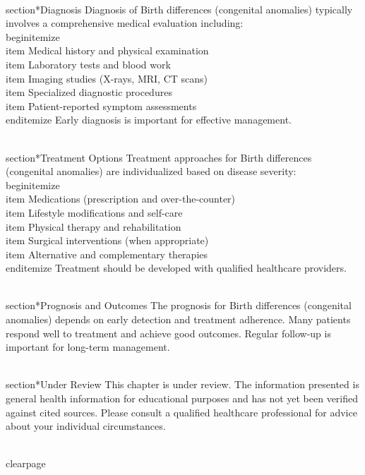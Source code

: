 \\section*{Diagnosis}
Diagnosis of Birth differences (congenital anomalies) typically involves a comprehensive medical evaluation including:
\\begin{itemize}
  \\item Medical history and physical examination
  \\item Laboratory tests and blood work
  \\item Imaging studies (X-rays, MRI, CT scans)
  \\item Specialized diagnostic procedures
  \\item Patient-reported symptom assessments
\\end{itemize}
Early diagnosis is important for effective management.

\\section*{Treatment Options}
Treatment approaches for Birth differences (congenital anomalies) are individualized based on disease severity:
\\begin{itemize}
  \\item Medications (prescription and over-the-counter)
  \\item Lifestyle modifications and self-care
  \\item Physical therapy and rehabilitation
  \\item Surgical interventions (when appropriate)
  \\item Alternative and complementary therapies
\\end{itemize}
Treatment should be developed with qualified healthcare providers.

\\section*{Prognosis and Outcomes}
The prognosis for Birth differences (congenital anomalies) depends on early detection and treatment adherence. Many patients respond well to treatment and achieve good outcomes. Regular follow-up is important for long-term management.

\\section*{Under Review}
This chapter is under review. The information presented is general health information for educational purposes and has not yet been verified against cited sources. Please consult a qualified healthcare professional for advice about your individual circumstances.

\\clearpage
